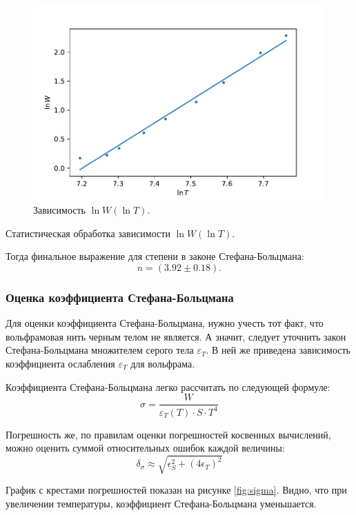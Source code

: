 \documentclass[12pt,a4paper]{article}
\begin{document}
\begin{figure}[h!]
	\includegraphics[scale=0.8]{gen/fig-linwt.pdf}
	\caption{Зависимость $\ln W ( \ln T).$}
	\label{fig:linwt}
\end{figure}

\begin{table}[H]
	\addtolength{\tabcolsep}{-4pt}
	\footnotesize
	
	\caption{Статистическая обработка зависимости $\ln W ( \ln T).$}
\end{table}

Тогда финальное выражение для степени в законе Стефана-Больцмана:
$$n = (3.92 \pm 0.18).$$


\subsubsection*{Оценка коэффициента Стефана-Больцмана}

Для оценки коэффициента Стефана-Больцмана, нужно учесть тот факт, что вольфрамовая нить черным телом не является. А значит, следует уточнить закон Стефана-Больцмана множителем серого тела $\varepsilon_T$.
В ней же приведена зависимость коэффициента ослабления $\varepsilon_T$ для вольфрама.

Коэффициента Стефана-Больцмана легко рассчитать по следующей формуле:
$$\sigma = \frac{W}{\varepsilon_T(T) \cdot S \cdot T^4}$$
 
Погрешность же, по правилам оценки погрешностей косвенных вычислений, можно оценить суммой относительных ошибок каждой величины:
$$\delta_\sigma \approx \sqrt{\epsilon_S^2 + (4\epsilon_T)^2}$$

График с крестами погрешностей показан на рисунке \ref{fig:sigma}. Видно, что при увеличении температуры, коэффициент Стефана-Больцмана уменьшается.
\end{document}
